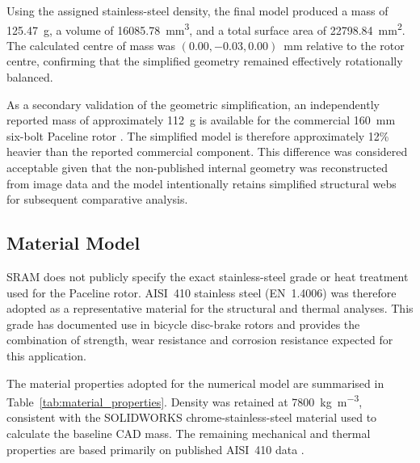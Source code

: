 \documentclass[11pt,a4paper]{article}
\begin{document}
Using the assigned stainless-steel density, the final model produced a mass
of \SI{125.47}{g}, a volume of \SI{16085.78}{mm^3}, and a total surface area
of \SI{22798.84}{mm^2}. The calculated centre of mass was
$(0.00,-0.03,0.00)$~mm relative to the rotor centre, confirming that the
simplified geometry remained effectively rotationally balanced.

As a secondary validation of the geometric simplification, an independently
reported mass of approximately \SI{112}{g} is available for the commercial
160~mm six-bolt Paceline rotor \cite{MTBIKERPaceline}. The simplified model
is therefore approximately 12\% heavier than the reported commercial
component. This difference was considered acceptable given that the
non-published internal geometry was reconstructed from image data and the
model intentionally retains simplified structural webs for subsequent
comparative analysis.


\subsection{Material Model}

SRAM does not publicly specify the exact stainless-steel grade or heat
treatment used for the Paceline rotor. AISI~410 stainless steel
(EN~1.4006) was therefore adopted as a representative material for the
structural and thermal analyses. This grade has documented use in bicycle
disc-brake rotors \cite{WorldStainlessSports} and provides the combination of
strength, wear resistance and corrosion resistance expected for this
application.

The material properties adopted for the numerical model are summarised in
Table~\ref{tab:material_properties}. Density was retained at
\SI{7800}{kg.m^{-3}}, consistent with the SOLIDWORKS chrome-stainless-steel
material used to calculate the baseline CAD mass. The remaining mechanical
and thermal properties are based primarily on published AISI~410 data
\cite{Atlas410,NIST410}.
\end{document}
